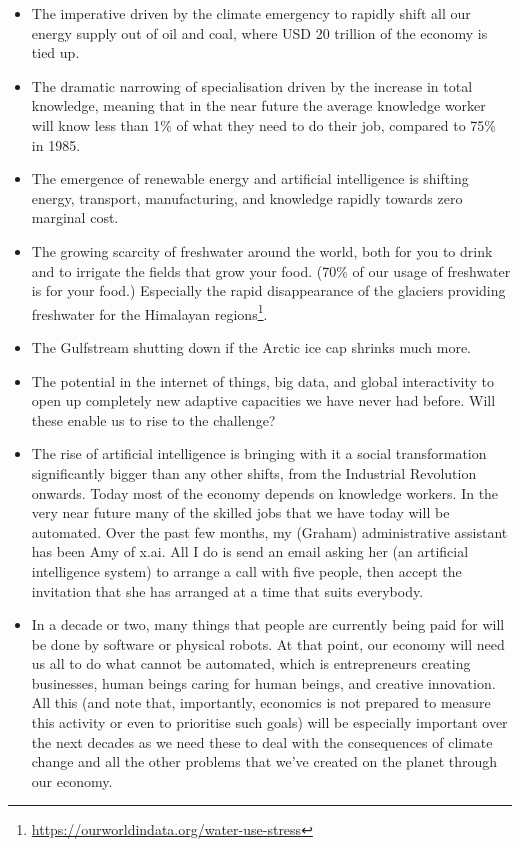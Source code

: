 \begin{itemize}
\item The imperative driven by the climate emergency to rapidly shift all our energy supply out of oil and coal, where USD 20 trillion of the economy is tied up\cite{birch-business-and-society}. 


\item The dramatic narrowing of specialisation driven by the increase in total knowledge, meaning that in the near future the average knowledge worker will know less than 1\% of what they need to do their job, compared to 75\% in 1985.


\item The emergence of renewable energy and artificial intelligence is shifting energy, transport, manufacturing, and knowledge rapidly towards zero marginal cost\cite{rifkin-zero-mc}. 


\item The growing scarcity of freshwater around the world, both for you to drink and to irrigate the fields that grow your food. (70\% of our usage of freshwater is for your food.) Especially the rapid disappearance of the glaciers providing freshwater for the Himalayan regions\footnote{\url{https://ourworldindata.org/water-use-stress}}.


\item The Gulfstream shutting down if the Arctic ice cap shrinks much more. 


\item The potential in the internet of things, big data, and global interactivity to open up completely new adaptive capacities we have never had before. Will these enable us to rise to the challenge?


\item The rise of artificial intelligence is bringing with it a social transformation significantly bigger than any other shifts, from the Industrial Revolution onwards. Today most of the economy depends on knowledge workers. In the very near future many of the skilled jobs that we have today will be automated. Over the past few months, my (Graham) administrative assistant has been Amy of x.ai. All I do is send an email asking her (an artificial intelligence system) to arrange a call with five people, then accept the invitation that she has arranged at a time that suits everybody.


\item In a decade or two, many things that people are currently being paid for will be done by software or physical robots. At that point, our economy will need us all to do what cannot be automated, which is entrepreneurs creating businesses, human beings caring for human beings, and creative innovation. All this (and note that, importantly, economics is not prepared to measure this activity or even to prioritise such goals) will be especially important over the next decades as we need these to deal with the consequences of climate change and all the other problems that we've created on the planet through our economy. 



\end{itemize}
